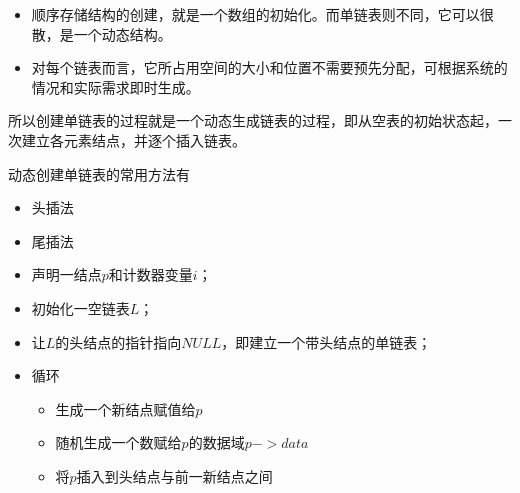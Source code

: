 \begin{frame}[fragile] 

\end{frame}


\begin{frame}[fragile]
 
\end{frame}

% 
%
% 


\begin{frame}
\begin{itemize}
\item  顺序存储结构的创建，就是一个数组的初始化。而单链表则不同，它可以很散，是一个动态结构。
\item 对每个链表而言，它所占用空间的大小和位置不需要预先分配，可根据系统的情况和实际需求即时生成。
\end{itemize}

所以创建单链表的过程就是一个动态生成链表的过程，即从空表的初始状态起，一次建立各元素结点，并逐个插入链表。
\end{frame}
%
%
\begin{frame} 
动态创建单链表的常用方法有 
\begin{itemize}
\item 
头插法
\item 
尾插法
\end{itemize}
\end{frame}
%
\begin{frame}
\begin{itemize}
\item 声明一结点$p$和计数器变量$i$；
\item 初始化一空链表$L$；
\item 让$L$的头结点的指针指向$NULL$，即建立一个带头结点的单链表；
\item 循环
\begin{itemize}
\item 生成一个新结点赋值给$p$
\item 随机生成一个数赋给$p$的数据域$p->data$ 
\item 将$p$插入到头结点与前一新结点之间
\end{itemize}
\end{itemize}
\end{frame}
%
\begin{frame}[fragile]


\end{frame}

